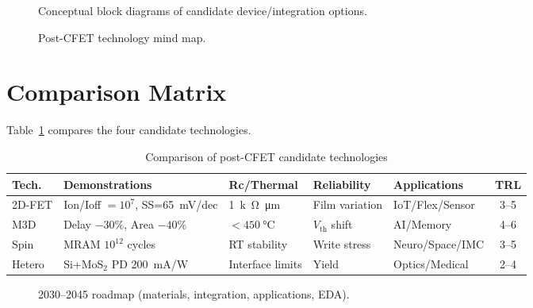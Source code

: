 \documentclass[conference]{IEEEtran}
\newcommand{\tikzcol}[2][\linewidth]{\resizebox{#1}{!}{}}
\begin{document}
\begin{figure*}[t]
  \centering
  \tikzcol[.95\textwidth]{\figures/block_diagram.tex}
  \caption{Conceptual block diagrams of candidate device/integration options.}
\end{figure*}

\begin{figure*}[t]
  \centering
  \tikzcol[.95\textwidth]{\figures/mindmap.tex}
  \caption{Post-CFET technology mind map.}
\end{figure*}

\section{Comparison Matrix}
Table~\ref{tab:matrix} compares the four candidate technologies.

\begin{table}[t]
\centering
\caption{Comparison of post-CFET candidate technologies}
\label{tab:matrix}
\begin{tabular}{@{}l l l l l c@{}}
\toprule
Tech. & Demonstrations & Rc/Thermal & Reliability & Applications & TRL \\
\midrule
2D-FET & Ion/Ioff $=10^7$, SS=\SI{65}{mV/dec} & \SI{1}{k\ohm\micro\meter} & Film variation & IoT/Flex/Sensor & 3--5 \\
M3D    & Delay $-30\%$, Area $-40\%$          & $<\SI{450}{\celsius}$    & $V_\mathrm{th}$ shift & AI/Memory       & 4--6 \\
Spin   & MRAM $10^{12}$ cycles                & RT stability             & Write stress  & Neuro/Space/IMC  & 3--5 \\
Hetero & Si+MoS$_2$ PD \SI{200}{mA/W}         & Interface limits         & Yield         & Optics/Medical    & 2--4 \\
\bottomrule
\end{tabular}
\end{table}

\begin{figure*}[t]
  \centering
  \tikzcol[.95\textwidth]{\figures/roadmap.tex}
  \caption{2030--2045 roadmap (materials, integration, applications, EDA).}
\end{figure*}
\end{document}
